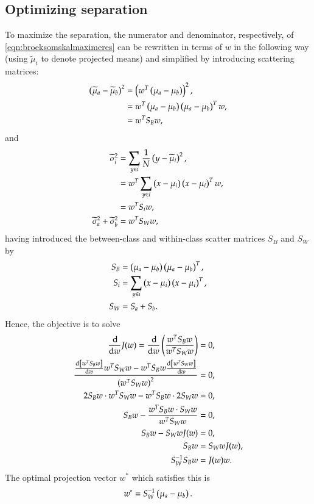 \subsection{Optimizing separation}
To maximize the separation, the numerator and denominator, respectively, of \eqref{eqn:broeksomskalmaximeres} can be rewritten in terms of $w$ in the following way (using $\widetilde{\mu}_i$ to denote projected means) and simplified by introducing scattering matrices:
\begin{align}
	\left( \widetilde{\mu}_a - \widetilde{\mu}_b \right)^2 &= \left( w^T \left( \mu_a - \mu_b \right) \right)^2, \\
	&= w^T \left( \mu_a - \mu_b \right) \left( \mu_a - \mu_b \right)^T w, \\
	&= w^T S_B w,
\end{align}
and
\begin{align}
	\widetilde{\sigma}_i^2 &= \sum_{y \in i} \frac{1}{N} \left( y - \widetilde{\mu}_i \right)^2, \\
	&= w^T \sum_{y \in i} \left( x - \mu_i \right) \left( x - \mu_i \right)^T w, \\
	&= w^T S_i w, \\
	\widetilde{\sigma}_a^2 + \widetilde{\sigma}_b^2 &= w^T S_W w,
\end{align}
having introduced the between-class and within-class scatter matrices $S_B$ and $S_W$ by
\begin{align}
	S_B &= \left( \mu_a - \mu_b \right) \left( \mu_a - \mu_b \right)^T, \\
	S_i &= \sum_{y \in i} \left( x - \mu_i \right) \left( x - \mu_i \right)^T, \\
	S_W &= S_a + S_b.
\end{align}
Hence, the objective is to solve
\begin{align}
	\frac{\ud }{\ud w} J(w) = \frac{\ud}{\ud w} \pp{ \frac{w^T S_B w}{w^T S_W w} } &= 0, \\
	\frac{ \diff{\,\sqb{w^T S_B w}}{w} w^T S_W w - w^T S_B w \diff{\,\sqb{w^T S_W w}}{w}}{\pp{ w^T S_W w }^2} &= 0, \\
	2 S_B w \cdot w^T S_W w - w^T S_B w \cdot 2 S_W w &= 0, \\
	S_B w - \frac{ w^T S_B w \cdot S_W w}{ w^T S_W w} &= 0, \\
	S_B w - S_W w J(w) &= 0, \\
	S_B w &= S_W w J(w), \\
	S_W^{-1} S_B w &= J(w) w.
\end{align}
The optimal projection vector $w^*$ which satisfies this is 
\begin{equation}
w^* = S_W^{-1}\left( \mu_a - \mu_b \right). \label{eqn:fisher_line}
\end{equation}
